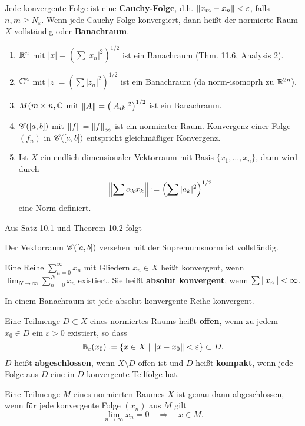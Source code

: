 Jede konvergente Folge ist eine \textbf{Cauchy-Folge}, d.h. $\left\lVert x_m -x_n\right\rVert < \varepsilon$, falls $n, m \geq N_\varepsilon$. Wenn jede Cauchy-Folge konvergiert, dann heißt der normierte Raum $X$ vollständig oder \textbf{Banachraum}.
\begin{beispiel}
	\begin{enumerate}[label=(\arabic*)]
		\item $\mathbb{R}^n$ mit $|x| = \left(\sum |x_n|^2\right)^{1/2}$ ist ein Banachraum (Thm. 11.6, Analysis 2).
		\item $\mathbb{C}^n$ mit $|z| = \left(\sum |z_n|^2\right)^{1/2}$ ist ein Banachraum (da norm-isomoprh zu $\mathbb{R}^{2n}$).
		\item $M(m \times n, \mathbb{C}$ mit $\left\lVert A\right\rVert = \left(|A_{ik}|^2\right)^{1/2}$ ist ein Banachraum.
		\item $\mathscr{C}([a,b])$ mit $\left\lVert f\right\rVert = {\left\lVert f\right\rVert}_\infty$ ist ein normierter Raum. Konvergenz einer Folge $(f_n)$ in $\mathscr{C}([a,b])$ entspricht gleichmäßiger Konvergenz. 
		\item\label{bsp5} Ist $X$ ein endlich-dimensionaler Vektorraum mit Basis $\{x_1, \dots, x_n\}$, dann wird durch
		\[\left\lVert\sum \alpha_k x_k\right\rVert := \left(\sum |a_k|^2\right)^{1/2}\]
		eine Norm definiert.
	\end{enumerate}
\end{beispiel}
Aus Satz 10.1 und Theorem 10.2 folgt
\begin{thm}\label{thm4_1}
	Der Vektorraum $\mathscr{C}([a,b])$ versehen mit der Supremumsnorm ist vollständig.
\end{thm}
Eine Reihe $\sum_{n=0}^\infty x_n$ mit Gliedern $x_n \in X$ heißt konvergent, wenn $\lim_{N \to \infty} \sum_{n=0}^N x_n$ existiert. Sie heißt \textbf{absolut konvergent}, wenn $\sum \left\lVert x_n\right\rVert < \infty$.
\begin{thm}\label{thm4_2}
	In einem Banachraum ist jede absolut konvergente Reihe konvergent.
\end{thm}
Eine Teilmenge $D \subset X$ eines normiertes Raums heißt \textbf{offen}, wenn zu jedem $x_0 \in D$ ein $\varepsilon > 0$ existiert, so dass
\[\mathbb{B}_\varepsilon(x_0) := \{x \in X \mid \left\lVert x-x_0\right\rVert < \varepsilon\} \subset D.\]
$D$ heißt \textbf{abgeschlossen}, wenn $X \setminus D$ offen ist und $D$ heißt \textbf{kompakt}, wenn jede Folge aus $D$ eine in $D$ konvergente Teilfolge hat.
\begin{satz}\label{satz4_3}
	Eine Teilmenge $M$ eines normierten Raumes $X$ ist genau dann abgeschlossen, wenn für jede konvergente Folge $(x_n)$ aus $M$ gilt
\[\lim_{n \to \infty} x_n = 0 \quad\Rightarrow\quad x \in M.\]
\end{satz}
